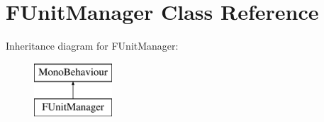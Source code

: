 \hypertarget{class_f_unit_manager}{}\section{F\+Unit\+Manager Class Reference}
\label{class_f_unit_manager}
Inheritance diagram for F\+Unit\+Manager\+:\begin{figure}[H]
\begin{center}
\leavevmode
\includegraphics[height=2.000000cm]{class_f_unit_manager}
\end{center}
\end{figure}
